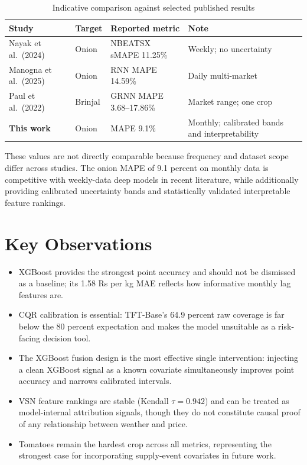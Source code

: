 \documentclass[12pt,a4paper]{report}
\begin{document}
\begin{table}[H]
\centering
\caption{Indicative comparison against selected published results}
\label{tab:ch6_litcompare}
\small
\begin{tabularx}{\textwidth}{L{0.28\textwidth}L{0.16\textwidth}L{0.20\textwidth}X}
\toprule
\textbf{Study} & \textbf{Target} & \textbf{Reported metric} & \textbf{Note} \\
\midrule
Nayak et al.\ (2024)   & Onion  & NBEATSX sMAPE 11.25\%    & Weekly; no uncertainty \\
Manogna et al.\ (2025) & Onion  & RNN MAPE 14.59\%          & Daily multi-market \\
Paul et al.\ (2022)    & Brinjal & GRNN MAPE 3.68--17.86\% & Market range; one crop \\
\textbf{This work}     & Onion  & MAPE 9.1\%               & Monthly; calibrated bands and interpretability \\
\bottomrule
\end{tabularx}
\end{table}

These values are not directly comparable because frequency and dataset scope differ across
studies. The onion MAPE of 9.1 percent on monthly data is competitive with weekly-data deep
models in recent literature, while additionally providing calibrated uncertainty bands and
statistically validated interpretable feature rankings.

\section{Key Observations}

\begin{itemize}
    \item XGBoost provides the strongest point accuracy and should not be dismissed as a
    baseline; its 1.58 Rs per kg MAE reflects how informative monthly lag features are.

    \item CQR calibration is essential: TFT-Base's 64.9 percent raw coverage is far below
    the 80 percent expectation and makes the model unsuitable as a risk-facing decision tool.

    \item The XGBoost fusion design is the most effective single intervention: injecting
    a clean XGBoost signal as a known covariate simultaneously improves point accuracy
    and narrows calibrated intervals.

    \item VSN feature rankings are stable (Kendall $\tau = 0.942$) and can be treated as
    model-internal attribution signals, though they do not constitute causal proof of
    any relationship between weather and price.

    \item Tomatoes remain the hardest crop across all metrics, representing the strongest
    case for incorporating supply-event covariates in future work.
\end{itemize}
\end{document}
